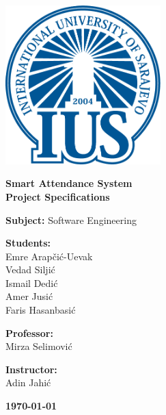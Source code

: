 \documentclass[a4paper, 12pt]{article}
\title{}
\author{}
\date{}
\begin{document}
  
  \begin{titlepage}
    \begin{center}
        \includegraphics[width=0.45\textwidth]{../GlobalImages/Logo.png} %
        \vspace{1.5cm}

        {\Huge \textbf{Smart Attendance System}}\\
        \vspace{0.5cm}
        {\Large \textbf{Project Specifications}}\\
        
        \vspace{2cm}
        
        {\large \textbf{Subject:} Software Engineering}\\
        
        \vspace{2cm}
        
        \begin{minipage}[t]{0.48\textwidth}
          \textbf{Students:}\\
          {\large Emre Arapčić-Uevak}\\
          {\large Vedad Siljić}\\
          {\large Ismail Dedić}\\
          {\large Amer Jusić}\\
          {\large Faris Hasanbasić}\\
        \end{minipage}
        \hfill
        \begin{minipage}[t]{0.48\textwidth}
          \raggedleft
          \textbf{Professor:} \\
          {\large Mirza Selimović}\\
          
          \vspace{0.5cm}

          \textbf{Instructor:} \\
          {\large Adin Jahić}\\
        \end{minipage}


        
        \vfill  %
        
        \textbf{\today}  %
        
    \end{center}
  \end{titlepage}
\end{document}
